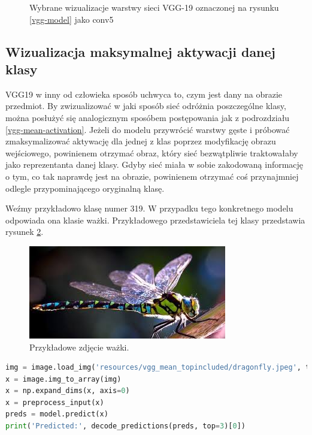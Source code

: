 \begin{figure}
\caption{Wybrane wizualizacje warstwy sieci VGG-19 oznaczonej na rysunku \ref{vgg-model} jako conv5}
\label{mean-vgg-vis-c5bx}
\end{figure}

\subsection{Wizualizacja maksymalnej aktywacji danej klasy}
\label{vgg-class-visualisation}

VGG19 w inny od człowieka sposób uchwyca to, czym jest dany na obrazie przedmiot. By zwizualizować w jaki sposób sieć odróżnia poszczególne klasy, można posłużyć się analogicznym sposóbem postępowania jak z podrozdziału \ref{vgg-mean-activation}.
Jeżeli do modelu przywrócić warstwy gęste i próbować zmaksymalizować aktywację dla jednej z klas poprzez modyfikację obrazu wejściowego, powinienem otrzymać obraz, który sieć bezwątpliwie traktowałaby jako reprezentanta danej klasy.
Gdyby sieć miała w sobie zakodowaną informację o tym, co tak naprawdę jest na obrazie, powinienem otrzymać coś przynajmniej odlegle przypominającego oryginalną klasę.

Weźmy przykładowo klasę numer 319. W przypadku tego konkretnego modelu odpowiada ona klasie ważki. Przykładowego przedstawiciela tej klasy przedstawia rysunek \ref{fig:wazka-real}.

\begin{figure}[ht]
\centerline{\includegraphics[scale=0.8]{resources/vgg_mean_topincluded/dragonfly.jpeg}}
\caption{Przykładowe zdjęcie ważki.}
\label{fig:wazka-real}
\end{figure}

\begin{lstlisting}[language=Python, caption={Predykcja klasy zdjęcia ważki (rys. \ref{fig:wazka-real}.)}, label={lst:wazkaprediction}, captionpos=b]
img = image.load_img('resources/vgg_mean_topincluded/dragonfly.jpeg', target_size=(224, 224))
x = image.img_to_array(img)
x = np.expand_dims(x, axis=0)
x = preprocess_input(x)
preds = model.predict(x)
print('Predicted:', decode_predictions(preds, top=3)[0])
\end{lstlisting}

